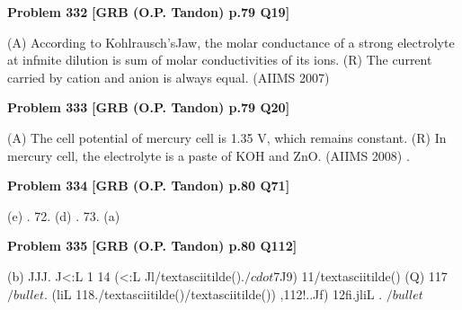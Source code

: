 \begin{problembox}
\textbf{Problem 332} \hfill \textbf{[GRB (O.P. Tandon) p.79 Q19]}
\label{q:ext-grb_all_questions-332}

(A) According to Kohlrausch'sJaw, the molar conductance of 
a strong electrolyte at infmite dilution is sum of molar 
conductivities of its ions. 
(R) The current carried by cation and anion is always equal. 
(AIIMS 2007)
\end{problembox}

\begin{problembox}
\textbf{Problem 333} \hfill \textbf{[GRB (O.P. Tandon) p.79 Q20]}
\label{q:ext-grb_all_questions-333}

(A) The cell potential of mercury cell is 1.35 V, which remains 
constant. 
(R) In mercury cell, the electrolyte is a paste of KOH and 
ZnO. 
(AIIMS 2008) .
\end{problembox}

\begin{problembox}
\textbf{Problem 334} \hfill \textbf{[GRB (O.P. Tandon) p.80 Q71]}
\label{q:ext-grb_all_questions-334}

(e) 
. 72. (d) 
. 73. (a)
\end{problembox}

\begin{problembox}
\textbf{Problem 335} \hfill \textbf{[GRB (O.P. Tandon) p.80 Q112]}
\label{q:ext-grb_all_questions-335}

(b) 
\underline{\hspace{1cm}} JJJ.\underline{\hspace{1cm}} J<:L \underline{\hspace{1cm}} 1 14 \underline{\hspace{1cm}} (<:L \underline{\hspace{1cm}} Jl/textasciitilde().$/cdot$\underline{\hspace{1cm}}7J9) \underline{\hspace{1cm}} 11/textasciitilde() \underline{\hspace{1cm}} (Q)\underline{\hspace{1cm}} \underline{\hspace{1cm}} 117 $/bullet$. \underline{\hspace{1cm}}(liL \underline{\hspace{1cm}} 118.\underline{\hspace{1cm}}/textasciitilde()/textasciitilde()) \underline{\hspace{1cm}} \underline{\hspace{1cm}},\underline{\hspace{1cm}}112!..\underline{\hspace{1cm}}Jf) \underline{\hspace{1cm}} 
12fi.\underline{\hspace{1cm}}jliL \underline{\hspace{1cm}} . 
$/bullet$
\end{problembox}

